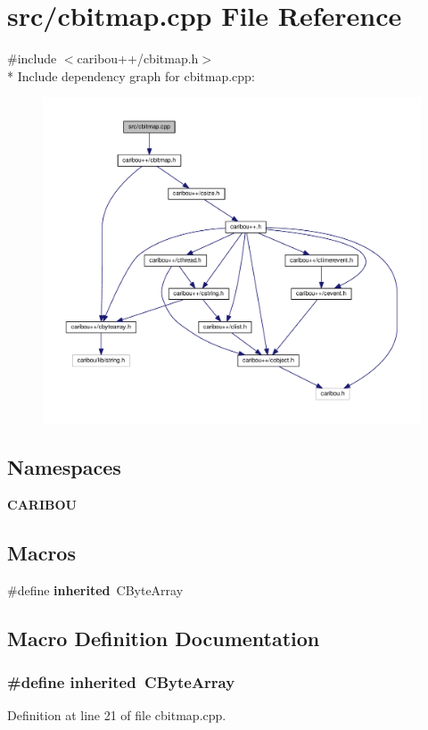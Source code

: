 \section{src/cbitmap.cpp File Reference}
\label{cbitmap_8cpp}
{\ttfamily \#include $<$caribou++/cbitmap.\-h$>$}\\*
Include dependency graph for cbitmap.\-cpp\-:\nopagebreak
\begin{figure}[H]
\begin{center}
\leavevmode
\includegraphics[width=350pt]{cbitmap_8cpp__incl}
\end{center}
\end{figure}
\subsection*{Namespaces}
\begin{DoxyCompactItemize}
\item 
{\bf C\-A\-R\-I\-B\-O\-U}
\end{DoxyCompactItemize}
\subsection*{Macros}
\begin{DoxyCompactItemize}
\item 
\#define {\bf inherited}~C\-Byte\-Array
\end{DoxyCompactItemize}


\subsection{Macro Definition Documentation}
\subsubsection[{inherited}]{\setlength{\rightskip}{0pt plus 5cm}\#define inherited~C\-Byte\-Array}\label{cbitmap_8cpp_a3920e3b7cb0909b941b2409493acf8f1}


Definition at line 21 of file cbitmap.\-cpp.

